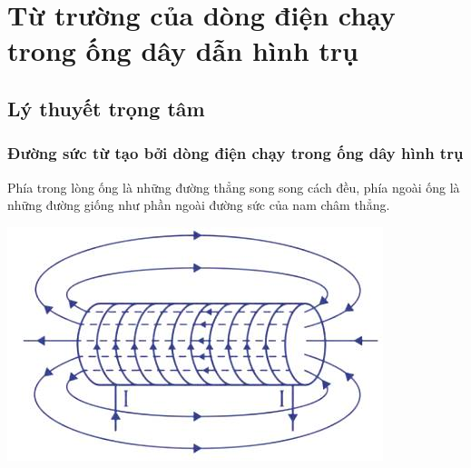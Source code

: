 \chapter{Từ trường của dòng điện chạy trong ống dây dẫn hình trụ }
\section{Lý thuyết trọng tâm}
\subsection{Đường sức từ tạo bởi dòng điện chạy trong ống dây hình trụ }
Phía trong lòng ống là những đường thẳng song song cách đều, phía ngoài ống là những đường giống như phần ngoài đường sức của nam châm thẳng.

\begin{center}
	\includegraphics[scale=0.8]{../figs/VN11-PH-26-L-018-3-h91.jpg}
\end{center}
